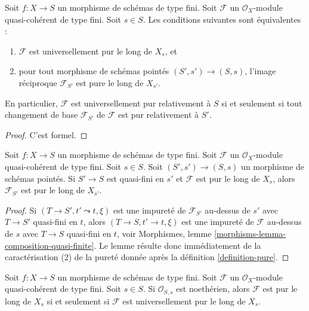 \begin{lemma}
\label{lemma-base-change-universally}
Soit $f : X \to S$ un morphisme de schémas de type fini.
Soit $\mathcal{F}$ un $\mathcal{O}_X$-module quasi-cohérent de type fini.
Soit $s \in S$. Les conditions suivantes sont équivalentes :
\begin{enumerate}
\item $\mathcal{F}$ est universellement pur le long de $X_s$, et
\item pour tout morphisme de schémas pointés $(S', s') \to (S, s)$,
l'image réciproque $\mathcal{F}_{S'}$ est pure le long de $X_{s'}$.
\end{enumerate}
En particulier, $\mathcal{F}$ est universellement pur relativement à $S$ si et
seulement si tout changement de base $\mathcal{F}_{S'}$ de $\mathcal{F}$ est
pur relativement à $S'$.
\end{lemma}

\begin{proof}
C'est formel.
\end{proof}

\begin{lemma}
\label{lemma-quasi-finite-base-change}
Soit $f : X \to S$ un morphisme de schémas de type fini.
Soit $\mathcal{F}$ un $\mathcal{O}_X$-module quasi-cohérent de type fini.
Soit $s \in S$. Soit $(S', s') \to (S, s)$ un morphisme de schémas pointés.
Si $S' \to S$ est quasi-fini en $s'$ et $\mathcal{F}$ est pur le long de $X_s$,
alors $\mathcal{F}_{S'}$ est pur le long de $X_{s'}$.
\end{lemma}

\begin{proof}
Si $(T \to S', t' \leadsto t, \xi)$ est une impureté de
$\mathcal{F}_{S'}$ au-dessus de $s'$ avec $T \to S'$ quasi-fini en $t$,
alors $(T \to S, t' \to t, \xi)$ est une impureté de $\mathcal{F}$
au-dessus de $s$ avec $T \to S$ quasi-fini en $t$, voir
Morphismes, lemme \ref{morphisms-lemma-composition-quasi-finite}.
Le lemme résulte donc immédiatement de la caractérisation (2)
de la pureté donnée après la
définition \ref{definition-pure}.
\end{proof}

\begin{lemma}
\label{lemma-Noetherian-base-change}
Soit $f : X \to S$ un morphisme de schémas de type fini.
Soit $\mathcal{F}$ un $\mathcal{O}_X$-module quasi-cohérent de type fini.
Soit $s \in S$. Si $\mathcal{O}_{S, s}$ est noethérien, alors
$\mathcal{F}$ est pur le long de $X_s$ si et seulement si $\mathcal{F}$
est universellement pur le long de $X_s$.
\end{lemma}

